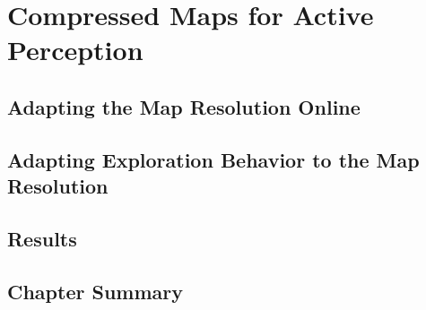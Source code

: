 \chapter{Compressed Maps for Active Perception}
\label{chapter5}

\section{Adapting the Map Resolution Online}

\section{Adapting Exploration Behavior to the Map Resolution}

\section{Results}

\section{Chapter Summary}
